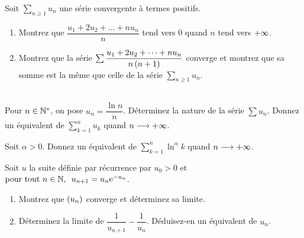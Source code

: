 \begin{corr}
\end{corr}

\begin{exosss}[Exercice 22]
Soit \(\sum_{n\geq1}u_n\) une série convergente à termes positifs.

\begin{enumerate}
    \item Montrez que \(\dfrac{u_1+2u_2+\dots+nu_n}{n}\) tend vers \(0\) quand \(n\) tend vers \(+\infty\). \\
    \item Montrez que la série \(\sum\dfrac{u_1+2u_2+\dots+nu_n}{n\left(n+1\right)}\) converge et montrez que sa somme est la même que celle de la série \(\sum_{n\geq1}u_n\).
\end{enumerate}
\end{exosss}

\begin{corr}
\end{corr}

\begin{exo}~\\
Pour \(n\in\mathbb{N}^*\), on pose \(u_n=\dfrac{\ln n}{n}\). Déterminez la nature de la série \(\sum u_n\). Donnez un équivalent de \(\sum_{k=1}^nu_k\) quand \(n\longrightarrow+\infty\).
\end{exo}

\begin{corr}
\end{corr}

\begin{exo}
Soit \(\alpha>0\). Donnez un équivalent de \(\sum_{k=1}^n\ln^\alpha k\) quand \(n\longrightarrow+\infty\).
\end{exo}

\begin{corr}
\end{corr}

\begin{exo}
Soit \(u\) la suite définie par récurrence par \(u_0>0\) et \(\quantifs{\tpt n\in\N}u_{n+1}=u_n\e{-u_n}\).

\begin{enumerate}
    \item Montrez que \(\left(u_n\right)\) converge et déterminez sa limite. \\
    \item Déterminez la limite de \(\dfrac{1}{u_{n+1}}-\dfrac{1}{u_n}\). Déduisez-en un équivalent de \(u_n\).
\end{enumerate}
\end{exo}

